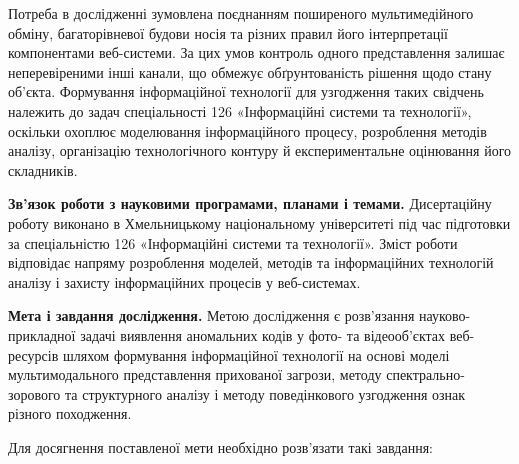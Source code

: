 Потреба в дослідженні зумовлена поєднанням поширеного мультимедійного обміну, багаторівневої будови носія та різних правил його інтерпретації компонентами веб-системи. За цих умов контроль одного представлення залишає неперевіреними інші канали, що обмежує обґрунтованість рішення щодо стану об’єкта. Формування інформаційної технології для узгодження таких свідчень належить до задач спеціальності 126 «Інформаційні системи та технології», оскільки охоплює моделювання інформаційного процесу, розроблення методів аналізу, організацію технологічного контуру й експериментальне оцінювання його складників.

\textbf{Зв’язок роботи з науковими програмами, планами і темами.}
Дисертаційну роботу виконано в Хмельницькому національному університеті під час підготовки за спеціальністю 126 «Інформаційні системи та технології». Зміст роботи відповідає напряму розроблення моделей, методів та інформаційних технологій аналізу і захисту інформаційних процесів у веб-системах.

\textbf{Мета і завдання дослідження.}
Метою дослідження є розв’язання науково-прикладної задачі виявлення аномальних кодів у фото- та відеооб’єктах веб-ресурсів шляхом формування інформаційної технології на основі моделі мультимодального представлення прихованої загрози, методу спектрально-зорового та структурного аналізу і методу поведінкового узгодження ознак різного походження.

Для досягнення поставленої мети необхідно розв’язати такі завдання:

